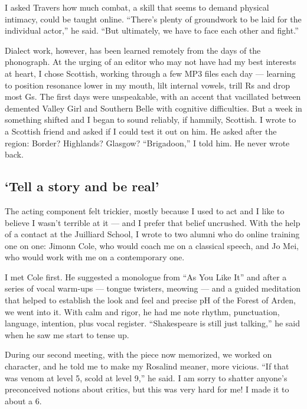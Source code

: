 I asked Travers how much combat, a skill that seems to demand physical
intimacy, could be taught online. ``There's plenty of groundwork to be
laid for the individual actor,'' he said. ``But ultimately, we have to
face each other and fight.''

Dialect work, however, has been learned remotely from the days of the
phonograph. At the urging of an editor who may not have had my best
interests at heart, I chose Scottish, working through a few MP3 files
each day --- learning to position resonance lower in my mouth, lilt
internal vowels, trill Rs and drop most Gs. The first days were
unspeakable, with an accent that vacillated between demented Valley Girl
and Southern Belle with cognitive difficulties. But a week in something
shifted and I began to sound reliably, if hammily, Scottish. I wrote to
a Scottish friend and asked if I could test it out on him. He asked
after the region: Border? Highlands? Glasgow? ``Brigadoon,'' I told him.
He never wrote back.

\hypertarget{tell-a-story-and-be-real}{%
\subsection{`Tell a story and be real'}\label{tell-a-story-and-be-real}}

The acting component felt trickier, mostly because I used to act and I
like to believe I wasn't terrible at it --- and I prefer that belief
uncrushed. With the help of a contact at the Juilliard School, I wrote
to two alumni who do online training one on one: Jimonn Cole, who would
coach me on a classical speech, and Jo Mei, who would work with me on a
contemporary one.

I met Cole first. He suggested a monologue from ``As You Like It'' and
after a series of vocal warm-ups --- tongue twisters, meowing --- and a
guided meditation that helped to establish the look and feel and precise
pH of the Forest of Arden, we went into it. With calm and rigor, he had
me note rhythm, punctuation, language, intention, plus vocal register.
``Shakespeare is still just talking,'' he said when he saw me start to
tense up.

During our second meeting, with the piece now memorized, we worked on
character, and he told me to make my Rosalind meaner, more vicious. ``If
that was venom at level 5, scold at level 9,'' he said. I am sorry to
shatter anyone's preconceived notions about critics, but this was very
hard for me! I made it to about a 6.


